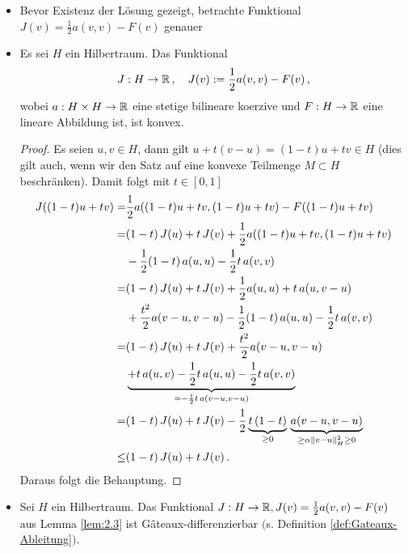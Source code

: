 \begin{itemize}
\item Bevor Existenz der Lösung gezeigt, betrachte Funktional $J(v) = \frac 1 2 a(v,v)-F(v)$ genauer

\item 
\begin{lemma}\label{lem:2.3}
Es sei $H$ ein Hilbertraum. Das Funktional
\[
	J: H \rightarrow \mathbb{R} \, , \quad J(v) := \frac 1 2 a(v,v) - F(v) \, ,
\]
wobei $a: H\times H \rightarrow \mathbb{R}$ eine stetige bilineare koerzive und $F: H\rightarrow \mathbb{R}$ eine lineare Abbildung ist, ist konvex.
\end{lemma}

\begin{proof}
Es seien $u,v \in H$, dann gilt $u + t(v-u) = (1-t)u + tv \in H$ (dies gilt auch, wenn wir den Satz auf eine konvexe Teilmenge $M \subset H$ beschränken). Damit folgt mit $t \in [0,1]$
\begin{align*}
	J((1-t)u+tv)  = & \frac 1 2 a((1-t)u+tv,(1-t)u+tv) - F((1-t)u+tv) \\
	= &(1-t) \, J(u) + t \, J(v) +  \frac 1 2 a((1-t)u+tv,(1-t)u+tv) \\
	 & - \frac 1 2(1-t) \, a(u,u)-\frac 1 2 t \, a(v,v) \\
	= & (1-t) \, J(u) + t \, J(v)  + \frac 1 2 a(u,u) + t \, a(u,v-u)  \\
	&+ \frac {t^2} 2 a(v-u,v-u) - \frac 12 (1-t)\, a(u,u) -\frac 1 2 t \, a(v,v) \\
	= & (1-t) \, J(u) + t \, J(v) + \frac {t^2} 2 a(v-u,v-u)  \\
	 &\underbrace{+ t \, a(u,v)  - \frac 12 t\, a(u,u) -\frac 1 2 t \, a(v,v) }_{=  -\frac 1 2 t\, a(v-u,v-u)}\\
	= &  (1-t) \, J(u) + t \, J(v) - \frac {1} 2 \underbrace{t \, (1-t)}_{\ge 0} \,\underbrace{ a(v-u,v-u) }_{\ge \alpha  \norm{v-u}_H^2 \ge 0} \\
	\le &   (1-t) \, J(u) + t \, J(v) \, .%
\end{align*}
Daraus folgt die Behauptung.
\end{proof}
\item \begin{lemma} \label{lem:2.4}
Sei $H$ ein Hilbertraum. Das Funktional $J: H \rightarrow \mathbb{R}, J(v) =\frac 1 2 a(v,v)-F(v)$ aus Lemma \ref{lem:2.3} ist Gâteaux-differenzierbar $($s. Definition \ref{def:Gateaux-Ableitung}$)$.
\end{lemma}


\end{itemize}
